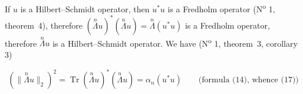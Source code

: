 
If $u$ is a Hilbert--Schmidt operator, then $u^*u$ is a Fredholm operator (N\textsuperscript{o} 1, theorem~4), therefore $(\overset{n}{\Lambda}u)^*(\overset{n}{\Lambda}u)=\overset{n}{\Lambda}(u^*u)$ is a Fredholm operator,  therefore $\overset{n}{\Lambda}u$ is a Hilbert--Schmidt operator. We have (N\textsuperscript{o} 1, theorem~3, corollary 3)

\[
(\lVert\overset{n}{\Lambda}u\rVert_2)^2=\operatorname{Tr}(\overset{n}{\Lambda}u)^*(\overset{n}{\Lambda}u)=\alpha_n(u^*u)\qquad\text{(formula (14), whence (17))}
\]
{\reversemarginpar{}}
